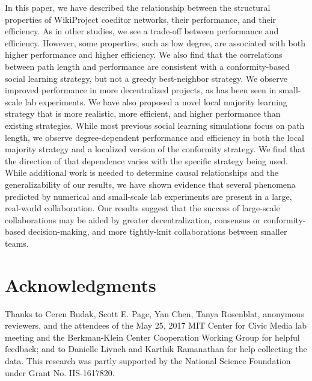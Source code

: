 In this paper, we have described the relationship between the structural properties of WikiProject
coeditor networks, their performance, and their efficiency.
As in other studies, we see a trade-off between performance and efficiency.
However, 
some properties, such as low degree, are associated with
both higher performance and higher efficiency.
We also find that the correlations between path length and performance are consistent with a conformity-based
social learning strategy, but not a greedy best-neighbor strategy.
We observe improved performance in more decentralized projects,
as has been seen in small-scale lab experiments.
We have also proposed a novel local majority learning strategy that is more realistic,
more efficient, and higher performance than existing strategies.
While most previous social learning simulations focus on path length,
we observe degree-dependent performance and efficiency
in both the local majority strategy
and a localized version of the conformity strategy.
We find that the direction of that dependence varies with the
specific strategy being used.
While additional work is needed to determine causal relationships
and the generalizability of our results,
we have shown evidence that several phenomena predicted by numerical
and small-scale lab experiments are present in a large,
real-world collaboration.
Our results suggest that the success of large-scale collaborations may be aided
by greater decentralization,
consensus or conformity-based decision-making,
and more tightly-knit collaborations between smaller teams.

\section{Acknowledgments}
Thanks to
Ceren Budak, Scott E. Page, Yan Chen, Tanya Rosenblat,
anonymous reviewers,
and the attendees of the May 25, 2017 MIT Center for Civic Media lab meeting
and the Berkman-Klein Center Cooperation Working Group for helpful feedback;
and to Danielle Livneh and Karthik Ramanathan for help collecting the data.
This research was partly supported by the National Science Foundation under Grant No. IIS-1617820.